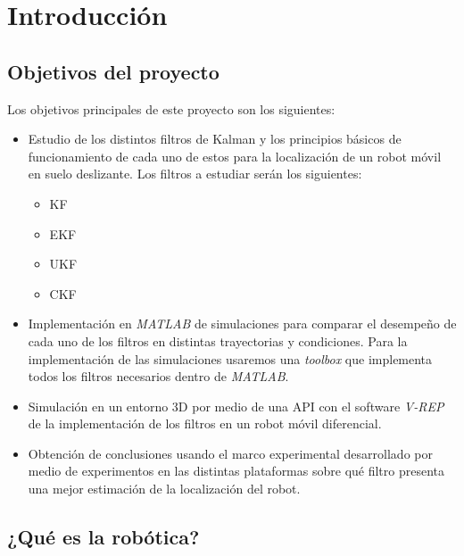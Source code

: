 \pagestyle{scrheadings}
\ihead[]{\rightmark}
\ofoot[]{\thepage{}}
\chapter{Introducción}\label{ch:capitulo1}

\section{Objetivos del proyecto}
Los objetivos principales de este proyecto son los siguientes:
\begin{itemize}
	\item Estudio de los distintos filtros de Kalman y los principios básicos de funcionamiento de cada uno de estos para la localización de un robot móvil en suelo deslizante. Los filtros a estudiar serán los siguientes:
    \begin{itemize}
    \item \ac{KF}
    \item \ac{EKF}
    \item \ac{UKF}
    \item \ac{CKF}
    \end{itemize}
    \item Implementación en \textit{MATLAB} de simulaciones para comparar el desempeño de cada uno de los filtros en distintas trayectorias y condiciones. Para la implementación de las simulaciones usaremos una \textit{toolbox} \cite{toolbox_simo} que implementa todos los filtros necesarios dentro de \textit{MATLAB}.
%
%
%
    \item Simulación en un entorno 3D por medio de una API con el software \textit{V-REP} de la implementación de los filtros en un robot móvil diferencial.
    \item Obtención de conclusiones usando el marco experimental desarrollado por medio de experimentos en las distintas plataformas sobre qué filtro presenta una mejor estimación de la localización del robot.
%
%
%
\end{itemize}
\section{¿Qué es la robótica?}

